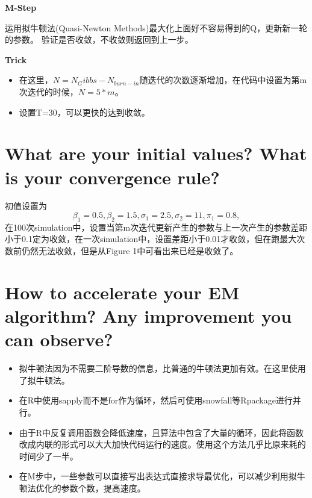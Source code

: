 \documentclass[11pt]{article}
\begin{document}
  
\centerline{\textbf{M-Step}}
运用拟牛顿法(Quasi-Newton Methods)最大化上面好不容易得到的Q，更新新一轮的参数。
验证是否收敛，不收敛则返回到上一步。

\centerline{\textbf{Trick}}
\begin{itemize}
\item 在这里，$N=N_Gibbs-N_{burn-in}$随迭代的次数逐渐增加，在代码中设置为第m次迭代的时候，$N = 5 * m$。
\item 设置T=30，可以更快的达到收敛。
\end{itemize}

\section{What are your initial values? What is your convergence rule?}
初值设置为$$\beta_1=0.5,\beta_2=1.5,\sigma_1=2.5,\sigma_2=11,\pi_1=0.8,$$ 在100次simulation中，设置当第m次迭代更新产生的参数与上一次产生的参数差距小于0.1定为收敛，在一次simulation中，设置差距小于0.01才收敛，但在跑最大次数前仍然无法收敛，但是从Figure 1中可看出来已经是收敛了。

\section{How to accelerate your EM algorithm? Any improvement you can observe?}
\begin{itemize}
  \item 拟牛顿法因为不需要二阶导数的信息，比普通的牛顿法更加有效。在这里使用了拟牛顿法。
  \item 在R中使用sapply而不是for作为循环，然后可使用snowfall等Rpackage进行并行。
  \item 由于R中反复调用函数会降低速度，且算法中包含了大量的循环，因此将函数改成内联的形式可以大大加快代码运行的速度。使用这个方法几乎比原来耗的时间少了一半。
  \item 在M步中，一些参数可以直接写出表达式直接求导最优化，可以减少利用拟牛顿法优化的参数个数，提高速度。
\end{itemize}
\end{document}
